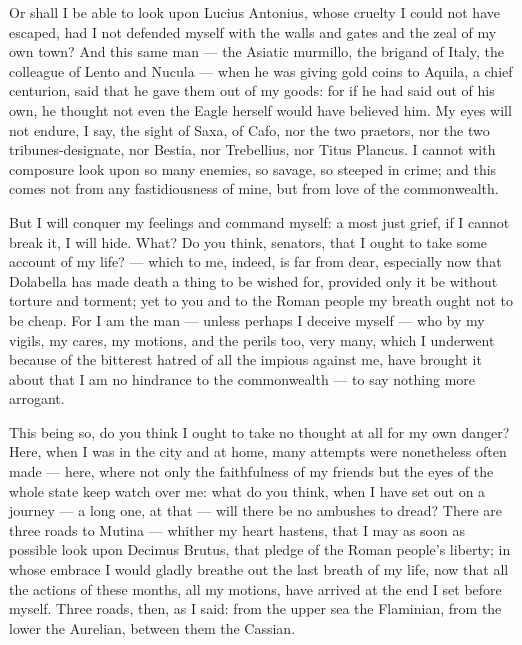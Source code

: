 Or shall I be able to look upon Lucius Antonius, whose cruelty I could not have escaped, had I not defended myself with the walls and gates and the zeal of my own town? And this same man --- the Asiatic murmillo, the brigand of Italy, the colleague of Lento and Nucula --- when he was giving gold coins to Aquila, a chief centurion, said that he gave them out of my goods: for if he had said out of his own, he thought not even the Eagle herself would have believed him. My eyes will not endure, I say, the sight of Saxa, of Cafo, nor the two praetors, nor the two tribunes-designate, nor Bestia, nor Trebellius, nor Titus Plancus. I cannot with composure look upon so many enemies, so savage, so steeped in crime; and this comes not from any fastidiousness of mine, but from love of the commonwealth.

 But I will conquer my feelings and command myself: a most just grief, if I cannot break it, I will hide. What? Do you think, senators, that I ought to take some account of my life? --- which to me, indeed, is far from dear, especially now that Dolabella has made death a thing to be wished for, provided only it be without torture and torment; yet to you and to the Roman people my breath ought not to be cheap. For I am the man --- unless perhaps I deceive myself --- who by my vigils, my cares, my motions, and the perils too, very many, which I underwent because of the bitterest hatred of all the impious against me, have brought it about that I am no hindrance to the commonwealth --- to say nothing more arrogant.

 This being so, do you think I ought to take no thought at all for my own danger? Here, when I was in the city and at home, many attempts were nonetheless often made --- here, where not only the faithfulness of my friends but the eyes of the whole state keep watch over me: what do you think, when I have set out on a journey --- a long one, at that --- will there be no ambushes to dread? There are three roads to Mutina --- whither my heart hastens, that I may as soon as possible look upon Decimus Brutus, that pledge of the Roman people's liberty; in whose embrace I would gladly breathe out the last breath of my life, now that all the actions of these months, all my motions, have arrived at the end I set before myself. Three roads, then, as I said: from the upper sea the Flaminian, from the lower the Aurelian, between them the Cassian.

